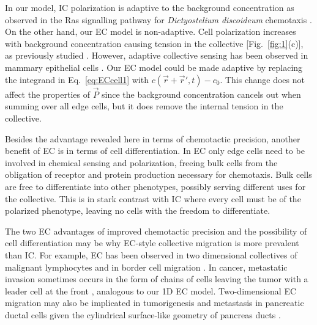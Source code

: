 In our model, IC polarization is adaptive to the background concentration as observed in the Ras signalling pathway for \textit{Dictyostelium discoideum} chemotaxis \cite{takeda2012incoherent}. On the other hand, our EC model is non-adaptive. Cell polarization increases with background concentration causing tension in the collective [Fig.\ \ref{fig:1}(c)], as previously studied \cite{camley2016emergent}. However, adaptive collective sensing has been observed in mammary epithelial cells \cite{ellison2016cell}. Our EC model could be made adaptive by replacing the integrand in Eq.\ \ref{eq:ECcell1} with
$c(\vec{r}+\vec{r}',t)-c_0$.
This change does not affect the properties of $\vec{P}$ since the background concentration cancels out when summing over all edge cells, but it does remove the internal tension in the collective.


Besides the advantage revealed here in terms of chemotactic precision, another benefit of EC is in terms of cell differentiation. In EC only edge cells need to be involved in chemical sensing and polarization, freeing bulk cells from the obligation of receptor and protein production necessary for chemotaxis. Bulk cells are free to differentiate into other phenotypes, possibly serving different uses for the collective. This is in stark contrast with IC where every cell must be of the polarized phenotype, leaving no cells with the freedom to differentiate.

The two EC advantages of improved chemotactic precision and the possibility of cell differentiation may be why EC-style collective migration is more prevalent than IC. For example, EC has been observed in two dimensional collectives of malignant lymphocytes \cite{malet2015collective} and in border cell migration \cite{cai2016modeling}. In cancer, metastatic invasion sometimes occurs in the form of chains of cells leaving the tumor with a leader cell at the front \cite{cheung2013collective,friedl2009collective}, analogous to our 1D EC model. Two-dimensional EC migration may also be implicated in tumorigenesis and metastasis in pancreatic ductal cells given the cylindrical surface-like geometry of pancreas ducts
\cite{bardeesy2002pancreatic}.

